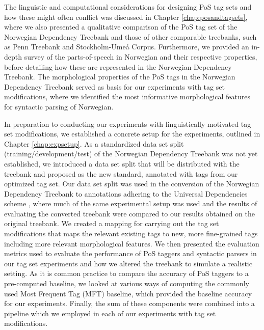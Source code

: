 \documentclass[a4paper,12pt,english]{book}
\begin{document}
The linguistic and computational considerations for designing PoS tag sets and
how these might often conflict was discussed in Chapter
\ref{chap:posandtagsets}, where we also presented a qualitative comparison of
the PoS tag set of the Norwegian Dependency Treebank and those of other
comparable treebanks, such as Penn Treebank and Stockholm-Umeå Corpus.
Furthermore, we provided an in-depth survey of the parts-of-speech in Norwegian
and their respective properties, before detailing how these are represented in
the Norwegian Dependency Treebank. The morphological properties of the PoS tags
in the Norwegian Dependency Treebank served as basis for our experiments with
tag set modifications, where we identified the most informative morphological
features for syntactic parsing of Norwegian.

In preparation to conducting our experiments with linguistically motivated tag
set modifications, we established a concrete setup for the experiments,
outlined in Chapter \ref{chap:expsetup}. As a standardized data set split
(training/development/test) of the Norwegian Dependency Treebank was not yet
established, we introduced a data set split that will be distributed with the
treebank and proposed as the new standard, annotated with tags from our
optimized tag set. Our data set split was used in the conversion of the
Norwegian Dependency Treebank to annotations adhering to the Universal
Dependencies scheme \cite{Ovr:Hoh:16}, where much of the same experimental
setup was used and the results of evaluating the converted treebank were compared to
our results obtained on the original treebank.
We created a mapping for carrying out the tag set
modifications that maps the relevant existing tags to new, more fine-grained
tags including more relevant morphological features. We then presented the
evaluation metrics used to evaluate the performance of PoS taggers and
syntactic parsers in our tag set experiments and how we altered the treebank to
simulate a realistic setting. As it is common practice to compare the accuracy
of PoS taggers to a pre-computed baseline, we looked at various ways of
computing the commonly used Most Frequent Tag (MFT) baseline, which provided
the baseline accuracy for our experiments. Finally, the sum of these components
were combined into a pipeline which we employed in each of our experiments with
tag set modifications.
\end{document}
